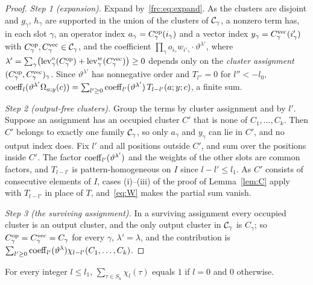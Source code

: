 \begin{proof}
\emph{Step 1 (expansion).} Expand by~\eqref{frc:eq:expand}. As the clusters are disjoint and $g_\gamma$, $h_\gamma$ are
supported in the union of the clusters of $\mathcal{C}_\gamma$, a nonzero term has, in each slot $\gamma$, an operator index
$a_\gamma=C^{\mathrm{op}}_\gamma(i_\gamma)$ and a vector index $y_\gamma=C^{\mathrm{vec}}_\gamma(i'_\gamma)$ with
$C^{\mathrm{op}}_\gamma,C^{\mathrm{vec}}_\gamma\in\mathcal{C}_\gamma$, and the coefficient $\prod_\gamma o_{i_\gamma}w_{i'_\gamma}\cdot\vartheta^{\lambda'}$,
where $\lambda'=\sum_\gamma\bigl(\mathrm{lev}^o_\gamma(C^{\mathrm{op}}_\gamma)+\mathrm{lev}^w_\gamma(C^{\mathrm{vec}}_\gamma)\bigr)\ge0$ depends
only on the \emph{cluster assignment} $(C^{\mathrm{op}}_\gamma,C^{\mathrm{vec}}_\gamma)_\gamma$. Since $\vartheta^{\lambda'}$ has nonnegative
order and $T_{l''}=0$ for $l''<-l_0$,
$\operatorname{coeff}_l(\vartheta^{\lambda'}\Omega_{a;y}(c))=\sum_{l'\ge0}\operatorname{coeff}_{l'}(\vartheta^{\lambda'})\,T_{l-l'}(a;y;c)$, a finite
sum.

\emph{Step 2 (output-free clusters).} Group the terms by cluster assignment and by $l'$. Suppose an assignment has an
occupied cluster $C'$ that is none of $C_1,\dots,C_k$. Then $C'$ belongs to exactly one family $\mathcal{C}_\gamma$, so only
$a_\gamma$ and $y_\gamma$ can lie in $C'$, and no output index does. Fix $l'$ and all positions outside $C'$, and sum over
the positions inside $C'$. The factor $\operatorname{coeff}_{l'}(\vartheta^{\lambda'})$ and the weights of the other slots are common
factors, and $T_{l-l'}$ is pattern-homogeneous on $I$ since $l-l'\le l_1$. As $C'$ consists of consecutive elements of $I$,
cases (i)--(iii) of the proof of Lemma~\ref{lem:C} apply with $T_{l-l'}$ in place of $T$, and~\eqref{eq:W} makes the
partial sum vanish.

\emph{Step 3 (the surviving assignment).} In a surviving assignment every occupied cluster is an output cluster, and the
only output cluster in $\mathcal{C}_\gamma$ is $C_\gamma$; so $C^{\mathrm{op}}_\gamma=C^{\mathrm{vec}}_\gamma=C_\gamma$ for every $\gamma$,
$\lambda'=\lambda$, and the contribution is $\sum_{l'\ge0}\operatorname{coeff}_{l'}(\vartheta^\lambda)\chi_{l-l'}(C_1,\dots,C_k)$.
\end{proof}

\begin{lemma}\label{frc:lem:diagonal}
For every integer $l\le l_1$, $\sum_{\tau\in S_k}\chi_l(\tau)$ equals $1$ if $l=0$ and $0$ otherwise.
\end{lemma}

